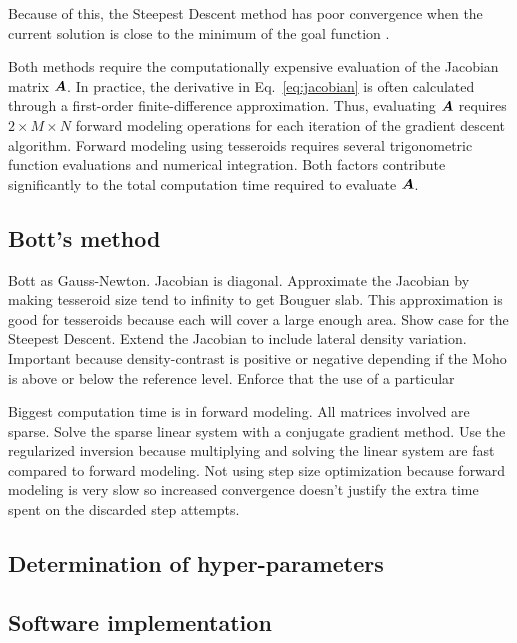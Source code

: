 \documentclass[extra]{gji}
\newcommand{\eq}[1]{Eq.~\ref{eq:#1}}
\newcommand{\mbf}[1]{\hbox{\mathversion{bold}$#1$}}
\begin{document}
\noindent
Because of this, the Steepest Descent method has poor convergence when the
current solution is close to the minimum of the goal function
\citep{kelley_iterative_1987}.

Both methods require the computationally expensive evaluation of the Jacobian
matrix $\mbf{A}$.
In practice, the derivative in \eq{jacobian} is often calculated through a
first-order finite-difference approximation.
Thus, evaluating $\mbf{A}$ requires $2\times M \times N$ forward modeling
operations for each iteration of the gradient descent algorithm.
Forward modeling using tesseroids requires several trigonometric function
evaluations and numerical integration.
Both factors contribute significantly to the total computation time required to
evaluate $\mbf{A}$.


\subsection{Bott's method}

Bott as Gauss-Newton.
Jacobian is diagonal.
Approximate the Jacobian by making tesseroid size tend to infinity to get
Bouguer slab.
This approximation is good for tesseroids because each will cover a large
enough area.
Show case for the Steepest Descent.
Extend the Jacobian to include lateral density variation.
Important because density-contrast is positive or negative depending if the
Moho is above or below the reference level.
Enforce that the use of a particular

Biggest computation time is in forward modeling.
All matrices involved are sparse.
Solve the sparse linear system with a conjugate gradient method.
Use the regularized inversion because multiplying and solving the linear system
are fast compared to forward modeling.
Not using step size optimization because forward modeling is very slow so
increased convergence doesn't justify the extra time spent on the discarded
step attempts.

\subsection{Determination of hyper-parameters}



\subsection{Software implementation}
\end{document}
